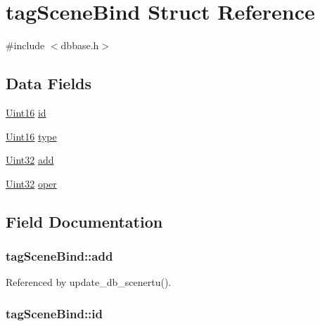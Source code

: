 \hypertarget{structtagSceneBind}{\section{tag\-Scene\-Bind Struct Reference}
\label{structtagSceneBind}
}


{\ttfamily \#include $<$dbbase.\-h$>$}

\subsection*{Data Fields}
\begin{DoxyCompactItemize}
\item 
\hyperlink{base_8h_ae9f2e1f80fbd243687a04febbf590e13}{Uint16} \hyperlink{structtagSceneBind_a7af7656ae0bc579bbbdf657e0be9e5cd}{id}
\item 
\hyperlink{base_8h_ae9f2e1f80fbd243687a04febbf590e13}{Uint16} \hyperlink{structtagSceneBind_a0e30d959ea0e866b737beb4560d3250a}{type}
\item 
\hyperlink{base_8h_a60cf7b3c038ce37a50796e8eaddf0b5f}{Uint32} \hyperlink{structtagSceneBind_afbe69220392e282e05876c2910f1c9ab}{add}
\item 
\hyperlink{base_8h_a60cf7b3c038ce37a50796e8eaddf0b5f}{Uint32} \hyperlink{structtagSceneBind_a58ac928d8b24858fb34900db40745171}{oper}
\end{DoxyCompactItemize}


\subsection{Field Documentation}
\hypertarget{structtagSceneBind_afbe69220392e282e05876c2910f1c9ab}{
\subsubsection[{add}]{ tag\-Scene\-Bind\-::add}}\label{structtagSceneBind_afbe69220392e282e05876c2910f1c9ab}


Referenced by update\-\_\-db\-\_\-scenertu().

\hypertarget{structtagSceneBind_a7af7656ae0bc579bbbdf657e0be9e5cd}{
\subsubsection[{id}]{ tag\-Scene\-Bind\-::id}}\label{structtagSceneBind_a7af7656ae0bc579bbbdf657e0be9e5cd}


